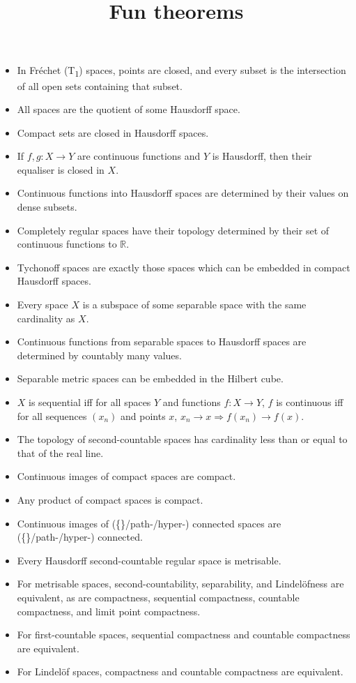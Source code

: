 \documentclass[12pt]{article}
\title{Fun theorems}
\author{}
\date{}
\newcommand{\tS}[1]{\textsubscript{#1}}
\newcommand{\R}{\mathbb{R}}
\begin{document}

\maketitle

\vspace{-6ex}

\begin{itemize}
\item In Fr\'{e}chet (T\tS{1}) spaces, points are closed, and every subset is the intersection of all open sets containing that subset.
\item All spaces are the quotient of some Hausdorff space.
\item Compact sets are closed in Hausdorff spaces.
\item If $f, g: X \rightarrow Y$ are continuous functions and $Y$ is Hausdorff, then their equaliser is closed in $X$.
\item Continuous functions into Hausdorff spaces are determined by their values on dense subsets.
\item Completely regular spaces have their topology determined by their set of continuous functions to $\R$.
\item Tychonoff spaces are exactly those spaces which can be embedded in compact Hausdorff spaces.
\item Every space $X$ is a subspace of some separable space with the same cardinality as $X$.
\item Continuous functions from separable spaces to Hausdorff spaces are determined by countably many values.
\item Separable metric spaces can be embedded in the Hilbert cube.
\item $X$ is sequential iff for all spaces $Y$ and functions $f: X \rightarrow Y$, $f$ is continuous iff for all sequences $(x_n)$ and points $x$, $x_n \rightarrow x \Rightarrow f(x_n) \rightarrow f(x)$.
\item The topology of second-countable spaces has cardinality less than or equal to that of the real line.
\item Continuous images of compact spaces are compact.
\item Any product of compact spaces is compact.
\item Continuous images of (\{\}/path-/hyper-) connected spaces are (\{\}/path-/hyper-) connected.
\item Every Hausdorff second-countable regular space is metrisable.
\item For metrisable spaces, second-countability, separability, and Lindel\"{o}fness are equivalent, as are compactness, sequential compactness, countable compactness, and limit point compactness.
\item For first-countable spaces, sequential compactness and countable compactness are equivalent. 
\item For Lindel\"{o}f spaces, compactness and countable compactness are equivalent.
\end{itemize}
\end{document}
